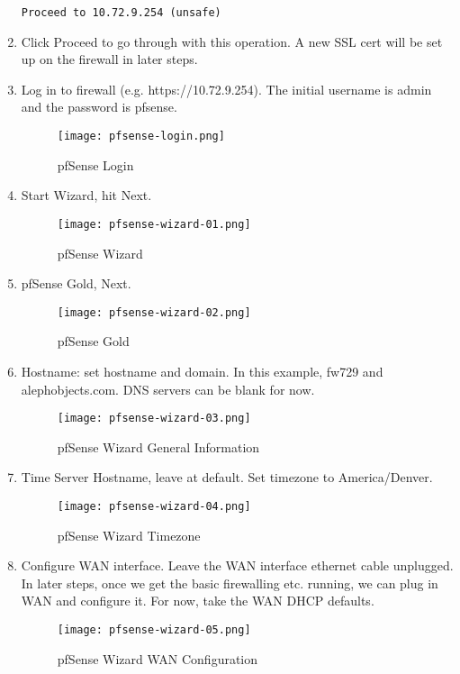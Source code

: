 \begin{enumerate}
\begin{verbatim}
Proceed to 10.72.9.254 (unsafe)
\end{verbatim}

 \item Click Proceed to go through with this operation. A new SSL cert will be set up on the firewall in later steps.

 \item Log in to firewall (e.g. https://10.72.9.254). The initial username is admin and the password is pfsense.

\begin{figure}[h!]
\texttt{[image: pfsense-login.png]}
 \caption{pfSense Login}
 \label{fig:pfsense-login}
\end{figure}

 \item Start Wizard, hit Next.
\begin{figure}[h!]
\texttt{[image: pfsense-wizard-01.png]}
 \caption{pfSense Wizard}
 \label{fig:pfsense-wizard-01}
\end{figure}

 \item pfSense Gold, Next.
\begin{figure}[h!]
\texttt{[image: pfsense-wizard-02.png]}
 \caption{pfSense Gold}
 \label{fig:pfsense-wizard-02}
\end{figure}

 \item Hostname: set hostname and domain. In this example, fw729 and alephobjects.com. DNS servers can be blank for now.
\begin{figure}[h!]
\texttt{[image: pfsense-wizard-03.png]}
 \caption{pfSense Wizard General Information}
 \label{fig:pfsense-wizard-03}
\end{figure}

 \item Time Server Hostname, leave at default. Set timezone to America/Denver.
\begin{figure}[h!]
\texttt{[image: pfsense-wizard-04.png]}
 \caption{pfSense Wizard Timezone}
 \label{fig:pfsense-wizard-04}
\end{figure}

 \item Configure WAN interface. Leave the WAN interface ethernet cable unplugged. In later steps, once we get the basic firewalling etc. running, we can plug in WAN and configure it. For now, take the WAN DHCP defaults.
\begin{figure}[h!]
\texttt{[image: pfsense-wizard-05.png]}
 \caption{pfSense Wizard WAN Configuration}
 \label{fig:pfsense-wizard-05}
\end{figure}


\end{enumerate}
